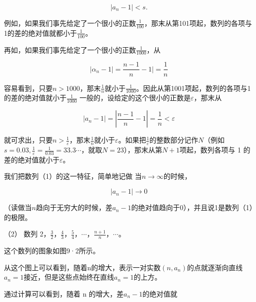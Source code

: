 \[
\left| a_{n} - 1 \right| < s.
\]

例如，如果我们事先给定了一个很小的正数\(\frac{1}{100}\)，那末从第101项起，数列的各项与1的差的绝对值就都小于\(\frac{1}{100}\)。

再如，如果我们事先给定了一个很小的正数\(\frac{1}{1000}\)，从

\[
\left| \alpha_{n} - 1 \right| = \frac{n - 1}{n} - 1 \Big | = \frac{1}{n}
\]

容易看到，只要\(n > 1000\)，那末\(\frac{1}{n}\)就小于\(\frac{1}{1000}\)。因此从第1001项起，数列的各项与1的差的绝对值就小于\(\frac{1}{1000}\)
一般的，设给定的这个很小的正数是\(\varepsilon\)，那末从

\[
\left| a_{n} - 1 \right| = \left| \frac{n - 1}{n} - 1 \right| = \frac{1}{n} < \varepsilon
\]

就可求出，只要\(n > \frac{1}{\varepsilon}\)，那末\(\frac{1}{n}\)就小于\(\varepsilon\)。如果把\(\frac{1}{\varepsilon}\)的整数部分记作\(N\)（例如\(s = 0.03, \frac{1}{\varepsilon} = \frac{1}{0.03} = 33.3\cdots\)，就取\(N = 23\)），那末从第\(N + 1\)项起，数列各项与
1 的差的绝对值就小于\(\varepsilon\)。

我们把数列（1）的这一特征，简单地记做 当\(n \to \infty\)的时候，

\[
\left| a_{n} - 1 \right|\rightarrow 0
\]

（读做当\(n\)趋向于无穷大的时候，差\(a_{n} - 1\)的绝对值趋向于0），并且说1是数列（1）的极限。

（2） 数列
2，\(\frac{3}{2}\)，\(\frac{4}{3}\)，\(\frac{5}{4}\)，\(\cdots\)，\(\frac{n+1}{n}\)，\(\cdots\)。

这个数列的图象如图9·2所示。

从这个图上可以看到，随着n的增大，表示一对实数\((n,a_{n})\)的点就逐渐向直线\(a_{n}=1\)接近，但是这些点始终在直线\(a_{n}=1\)的上方。

通过计算可以看到，随着 n 的增大，差\(a_{n}-1\)的绝对值就

